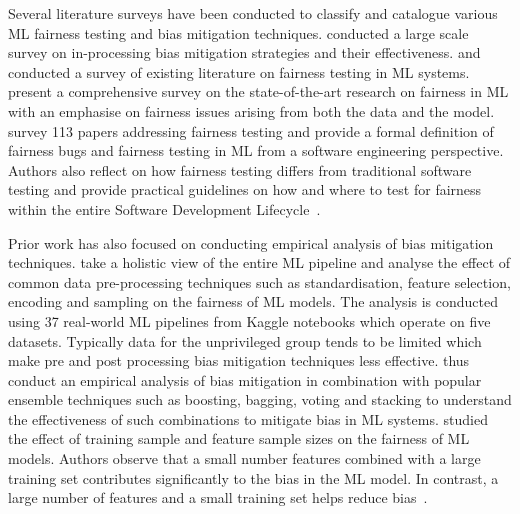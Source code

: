 \documentclass{article}
\begin{document}
Several literature surveys have been conducted to classify and
catalogue various ML fairness testing and bias mitigation techniques.
\citeauthor{wan2021modeling} conducted a large scale survey on
in-processing bias mitigation strategies and their effectiveness.
\citeauthor{chen2022fairness} and \citeauthor{mehrabi2021survey}
conducted a survey of existing literature on fairness testing in ML
systems. \citeauthor{mehrabi2021survey} present a comprehensive survey
on the state-of-the-art research on fairness in ML with an emphasise
on fairness issues arising from both the data and the model.
\citeauthor{chen2022fairness} survey 113 papers addressing fairness
testing and provide a formal definition of fairness bugs and fairness
testing in ML from a software engineering perspective. Authors also reflect on how
fairness testing differs from traditional software testing and provide
practical guidelines on how and where to test for fairness within the
entire Software Development
Lifecycle \cite{wan2021modeling,chen2022fairness,mehrabi2021survey}.

Prior work has also focused on conducting empirical analysis of bias
mitigation techniques. \citeauthor{biswas2021fair} take a holistic
view of the entire ML pipeline and analyse the effect of common data
pre-processing techniques such as standardisation, feature selection,
encoding and sampling on the fairness of ML models. The analysis is
conducted using 37 real-world ML pipelines from Kaggle notebooks which
operate on five datasets. Typically data for the unprivileged group
tends to be limited which make pre and post processing bias mitigation
techniques less effective. \citeauthor{feffer2022empirical} thus
conduct an empirical analysis of bias mitigation in combination with
popular ensemble techniques such as boosting, bagging, voting and
stacking to understand the effectiveness of such combinations to
mitigate bias in ML systems. \citeauthor{zhang2021ignorance} studied
the effect of training sample and feature sample sizes on the fairness
of ML models. Authors observe that a small number features combined
with a large training set contributes significantly to the bias in the
ML model. In contrast, a large number of features and a small training
set helps reduce
bias \cite{biswas2021fair,feffer2022empirical,zhang2021ignorance}.
\end{document}
